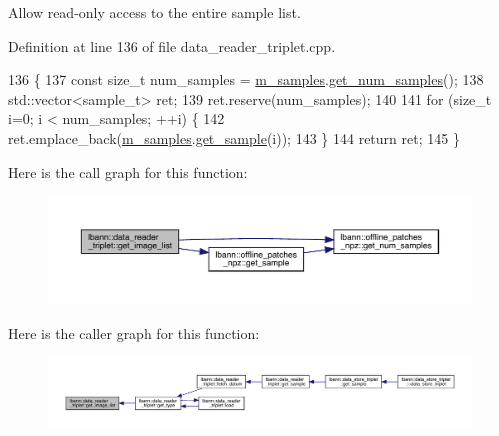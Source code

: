 Allow read-\/only access to the entire sample list. 



Definition at line 136 of file data\+\_\+reader\+\_\+triplet.\+cpp.


\begin{DoxyCode}
136                                                                                  \{
137   \textcolor{keyword}{const} \textcolor{keywordtype}{size\_t} num\_samples = \hyperlink{classlbann_1_1data__reader__triplet_a1f414c6d80f6e48fc91f98db0531f1f8}{m\_samples}.\hyperlink{classlbann_1_1offline__patches__npz_aa6fa05575f54a29b67d0bba8a2a9d363}{get\_num\_samples}();
138   std::vector<sample\_t> ret;
139   ret.reserve(num\_samples);
140 
141   \textcolor{keywordflow}{for} (\textcolor{keywordtype}{size\_t} i=0; i < num\_samples; ++i) \{
142     ret.emplace\_back(\hyperlink{classlbann_1_1data__reader__triplet_a1f414c6d80f6e48fc91f98db0531f1f8}{m\_samples}.\hyperlink{classlbann_1_1offline__patches__npz_a9c8ad05ffdf0d44ee1c9b61740dd42e3}{get\_sample}(i));
143   \}
144   \textcolor{keywordflow}{return} ret;
145 \}
\end{DoxyCode}
Here is the call graph for this function\+:\nopagebreak
\begin{figure}[H]
\begin{center}
\leavevmode
\includegraphics[width=350pt]{classlbann_1_1data__reader__triplet_a41a1506e4a77e610fd8db5a618e3e576_cgraph}
\end{center}
\end{figure}
Here is the caller graph for this function\+:\nopagebreak
\begin{figure}[H]
\begin{center}
\leavevmode
\includegraphics[width=350pt]{classlbann_1_1data__reader__triplet_a41a1506e4a77e610fd8db5a618e3e576_icgraph}
\end{center}
\end{figure}
\mbox{\label{classlbann_1_1data__reader__triplet_a2fa95d7757541b63f5191c1ffa7b7112}} 
